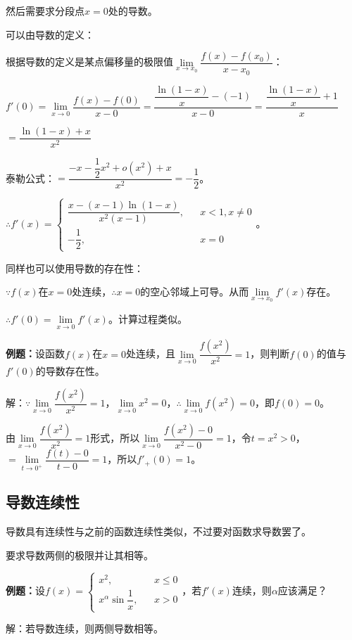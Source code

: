\documentclass[UTF8, 12pt]{ctexart}
\begin{document}
然后需要求分段点$x=0$处的导数。

可以由导数的定义：

根据导数的定义是某点偏移量的极限值$\lim\limits_{x\to x_0}\dfrac{f(x)-f(x_0)}{x-x_0}$：

$f'(0)=\lim\limits_{x\to 0}\dfrac{f(x)-f(0)}{x-0}=\dfrac{\dfrac{\ln(1-x)}{x}-(-1)}{x-0}=\dfrac{\dfrac{\ln(1-x)}{x}+1}{x}$\medskip

$=\dfrac{\ln(1-x)+x}{x^2}$

泰勒公式：$=\dfrac{-x-\dfrac{1}{2}x^2+o(x^2)+x}{x^2}=-\dfrac{1}{2}$。\medskip

$\therefore f'(x)=\left\{\begin{array}{lcl}
    \dfrac{x-(x-1)\ln(1-x)}{x^2(x-1)}, & & x<1,x\neq 0 \\
    -\dfrac{1}{2}, & & x=0
\end{array}
\right.$。\medskip

同样也可以使用导数的存在性：

$\because f(x)$在$x=0$处连续，$\therefore x=0$的空心邻域上可导。从而$\lim\limits_{x\to x_0}f'(x)$存在。

$\therefore f'(0)=\lim\limits_{x\to 0}f'(x)$。计算过程类似。

\textbf{例题：}设函数$f(x)$在$x=0$处连续，且$\lim\limits_{x\to0}\dfrac{f(x^2)}{x^2}=1$，则判断$f(0)$的值与$f'(0)$的导数存在性。

解：$\because\lim\limits_{x\to0}\dfrac{f(x^2)}{x^2}=1$，$\lim\limits_{x\to0}x^2=0$，$\therefore\lim\limits_{x\to0}f(x^2)=0$，即$f(0)=0$。

由$\lim\limits_{x\to0}\dfrac{f(x^2)}{x^2}=1$形式，所以$\lim\limits_{x\to0}\dfrac{f(x^2)-0}{x^2-0}=1$，令$t=x^2>0$，$=\lim\limits_{t\to0^+}\dfrac{f(t)-0}{t-0}=1$，所以$f'_+(0)=1$。

\subsection{导数连续性}

导数具有连续性与之前的函数连续性类似，不过要对函数求导数罢了。

要求导数两侧的极限并让其相等。\medskip

\textbf{例题：}设$f(x)=\left\{\begin{array}{lcl}
    x^2, & & x\leqslant 0 \\
    x^\alpha\sin\dfrac{1}{x}, & & x>0
\end{array}
\right.$，若$f'(x)$连续，则$\alpha$应该满足？ 

解：若导数连续，则两侧导数相等。
\end{document}
